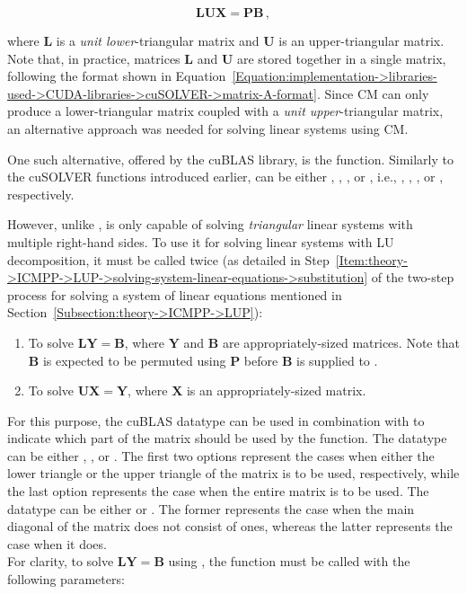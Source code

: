 \begin{equation}
	\mathbf{LUX} = \mathbf{PB} \,,
	\label{Equation:implementation->libraries-used->CUDA-libraries->cuBLAS->cusolverDnXgetrs-system-of-equations}
\end{equation}

where $\mathbf{L}$ is a \textit{unit lower}-triangular matrix and $\mathbf{U}$ is an upper-triangular matrix.
Note that, in practice, matrices $\mathbf{L}$ and $\mathbf{U}$ are stored together in a single matrix, following the format shown in Equation~\ref{Equation:implementation->libraries-used->CUDA-libraries->cuSOLVER->matrix-A-format}.
Since CM can only produce a lower-triangular matrix coupled with a \textit{unit upper}-triangular matrix, an alternative approach was needed for solving linear systems using CM.

One such alternative, offered by the cuBLAS library, is the  function.
Similarly to the cuSOLVER functions introduced earlier,  can be either , , , or , i.e., , , , or , respectively.

However, unlike ,  is only capable of solving \textit{triangular} linear systems with multiple right-hand sides.
To use it for solving linear systems with LU decomposition, it must be called twice (as detailed in Step~\ref{Item:theory->ICMPP->LUP->solving-system-linear-equations->substitution} of the two-step process for solving a system of linear equations mentioned in Section~\ref{Subsection:theory->ICMPP->LUP}):

\begin{enumerate}
	\item To solve $\mathbf{LY}=\mathbf{B}$, where $\mathbf{Y}$ and $\mathbf{B}$ are appropriately-sized matrices.
		Note that $\mathbf{B}$ is expected to be permuted using $\mathbf{P}$ before $\mathbf{B}$ is supplied to .
	\item To solve $\mathbf{UX}=\mathbf{Y}$, where $\mathbf{X}$ is an appropriately-sized matrix.
\end{enumerate}

For this purpose, the cuBLAS datatype  can be used in combination with  to indicate which part of the matrix should be used by the  function.
The  datatype can be either , , or .
The first two options represent the cases when either the lower triangle or the upper triangle of the matrix is to be used, respectively, while the last option represents the case when the entire matrix is to be used.
The  datatype can be either  or .
The former represents the case when the main diagonal of the matrix does not consist of ones, whereas the latter represents the case when it does.\\
For clarity, to solve $\mathbf{LY}=\mathbf{B}$ using , the function must be called with the following parameters:

